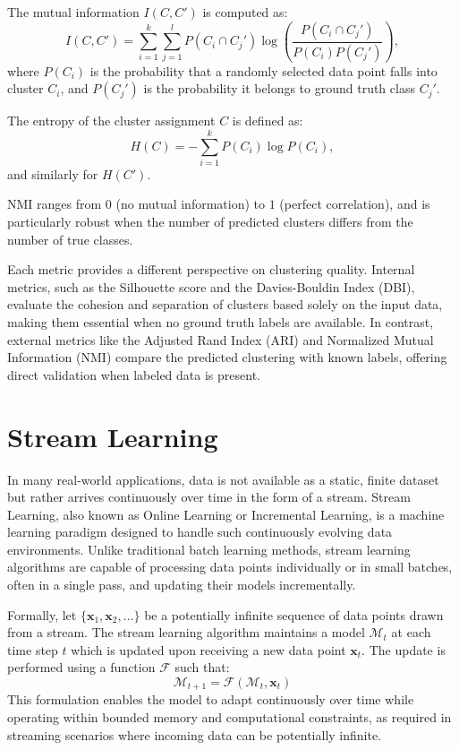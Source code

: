 The mutual information $ I(C, C') $ is computed as:
\begin{equation}
    I(C, C') = \sum_{i=1}^{k} \sum_{j=1}^{l} P(C_i \cap C_j') \log \left( \frac{P(C_i \cap C_j')}{P(C_i) P(C_j')} \right),
\end{equation}
where $ P(C_i) $ is the probability that a randomly selected data point falls into cluster $ C_i $, and $ P(C_j') $ is the probability it belongs to ground truth class $ C_j' $.

The entropy of the cluster assignment $ C $ is defined as:
\begin{equation}
    H(C) = -\sum_{i=1}^{k} P(C_i) \log P(C_i),
\end{equation}
and similarly for $ H(C') $.

NMI ranges from $ 0 $ (no mutual information) to $ 1 $ (perfect correlation),
and is particularly robust when the number of predicted clusters differs from
the number of true classes.

Each metric provides a different perspective on clustering quality. Internal
metrics, such as the Silhouette score and the Davies-Bouldin Index (DBI),
evaluate the cohesion and separation of clusters based solely on the input
data, making them essential when no ground truth labels are available. In
contrast, external metrics like the Adjusted Rand Index (ARI) and Normalized
Mutual Information (NMI) compare the predicted clustering with known labels,
offering direct validation when labeled data is present.

\section{Stream Learning}\label{sec:stream_learning}
In many real-world applications, data is not available as a static, finite
dataset but rather arrives continuously over time in the form of a stream.
Stream Learning, also known as Online Learning or Incremental Learning, is a
machine learning paradigm designed to handle such continuously evolving data
environments. Unlike traditional batch learning methods, stream learning
algorithms are capable of processing data points individually or in small
batches, often in a single pass, and updating their models incrementally.

Formally, let $\{\mathbf{x}_1, \mathbf{x}_2,\ldots \} $ be a potentially
infinite sequence of data points drawn from a stream. The stream learning
algorithm maintains a model $\mathcal{M}_t$ at each time step $t$ which is
updated upon receiving a new data point $\mathbf{x}_t$. The update is performed
using a function $\mathcal{F}$ such that:
\begin{equation}
    \mathcal{M}_{t+1} = \mathcal{F}(\mathcal{M}_t, \mathbf{x}_t)
\end{equation}
This formulation enables the model to adapt continuously over time while
operating within bounded memory and computational constraints, as required
in streaming scenarios where incoming data can be potentially infinite.

